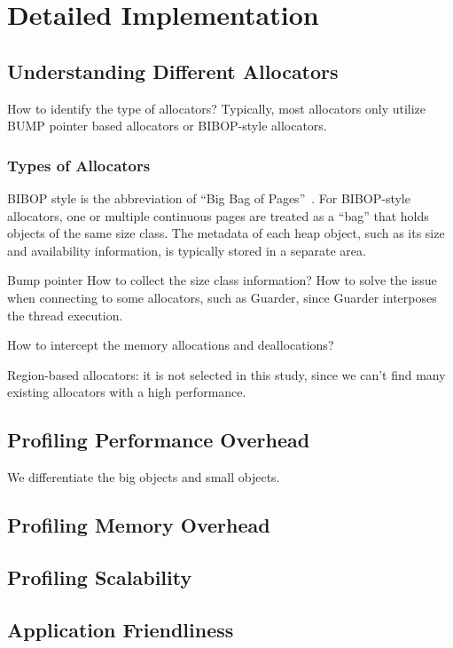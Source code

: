 \section{Detailed Implementation}

\subsection{Understanding Different Allocators}

How to identify the type of allocators? Typically, most allocators only utilize BUMP pointer based allocators or BIBOP-style allocators. 

\subsubsection{Types of Allocators}
BIBOP style is the abbreviation of ``Big Bag of Pages''~\cite{hanson1980}.
For BIBOP-style allocators, one or multiple continuous pages are treated as a ``bag'' that holds objects of the same size class. The metadata of each heap object, such as its size and availability information, is typically stored in a separate area.

Bump pointer
How to collect the size class information?
How to solve the issue when connecting to some allocators, such as Guarder, since Guarder interposes the thread execution. 

How to intercept the memory allocations and deallocations? 

Region-based allocators: 
it is not selected in this study, since we can't find many existing allocators with a high performance. 


\subsection{Profiling Performance Overhead}

We differentiate the big objects and small objects. 

\subsection{Profiling Memory Overhead}

\subsection{Profiling Scalability}

\subsection{Application Friendliness}
